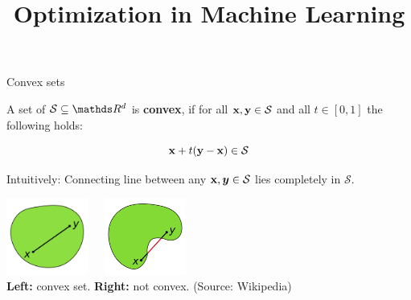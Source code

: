 \documentclass[11pt,compress,t,notes=noshow, xcolor=table]{beamer}
\title{Optimization in Machine Learning}
\date{}
\begin{document}
\sloppy




\begin{vbframe}{Convex sets}

A set of $\mathcal{S} \subseteq \R^d$ is \textbf{convex}, if for all $\mathbf{x}, \mathbf{y} \in \mathcal{S}$ and all $t \in [0, 1]$ the following holds:

$$
\mathbf{x} + t (\mathbf{y} - \mathbf{x}) \in \mathcal{S}
$$

Intuitively: Connecting line between any $\mathbf{x}, \bm{y} \in \mathcal{S}$ lies completely in $\mathcal{S}$.

\begin{center}
    \includegraphics[width=0.2\textwidth]{figure_man/convex.png}~~~\includegraphics[width=0.2\textwidth]{figure_man/concave.png} \\
    \footnotesize{
        \textbf{Left:} convex set.
        \textbf{Right:} not convex. (Source: Wikipedia)}
\end{center}

\end{vbframe}
\end{document}
